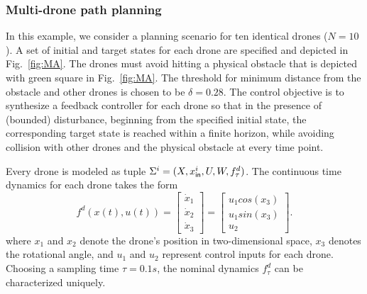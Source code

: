 \subsubsection{Multi-drone path planning}\label{sec:Multirobot}
In this example, we consider a planning scenario for ten identical drones ($N=10$). A set of initial and target states for each drone are specified and depicted in Fig.~\ref{fig:MA}. The drones must avoid hitting a physical obstacle that is depicted with green square in Fig.~\ref{fig:MA}. %
The threshold for minimum distance from the obstacle and other drones is chosen to be $\delta=0.28$. %
The control objective is to synthesize a feedback controller for each drone so that in the presence of (bounded) disturbance, beginning from the specified initial state, the corresponding target state is reached within a finite horizon, while avoiding collision with other drones and the physical obstacle at every time point. 

Every drone is modeled as tuple $\Sigma^i=(X,x_{\mathsf{in}}^i,U,W,f^d_\tau)$. %
The continuous time dynamics for each drone takes the form
\begin{equation*}\label{eq:unicycle_ss}
	f^{d}(x(t),u(t))=
	\begin{bmatrix}
		\dot{x}_1\\
		\dot{x}_2\\
		\dot{x}_3
	\end{bmatrix}=
	\begin{bmatrix}
		u_1cos(x_3)\\
		u_1sin(x_3)\\
		u_2
	\end{bmatrix}.
\end{equation*}
where $x_1$ and $x_2$ denote the drone's position in two-dimensional space, $x_3$ denotes the rotational angle, and $u_1$ and $u_2$ represent control inputs for each drone. Choosing a sampling time $\tau=0.1s$, the nominal dynamics $f^d_\tau$ can be characterized uniquely. %


